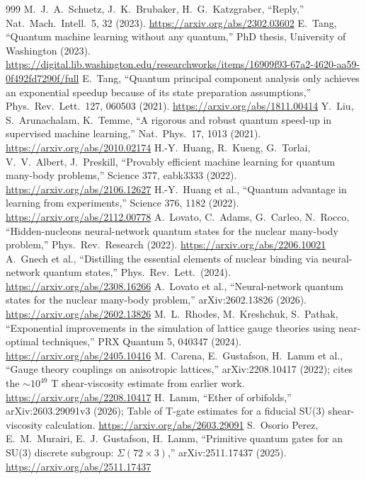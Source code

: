\begin{thebibliography}{999}
 M.~J.~A.~Schuetz, J.~K.~Brubaker, H.~G.~Katzgraber, ``Reply,'' Nat.\ Mach.\ Intell.\ 5, 32 (2023). \url{https://arxiv.org/abs/2302.03602}
 E.~Tang, ``Quantum machine learning without any quantum,'' PhD thesis, University of Washington (2023). \url{https://digital.lib.washington.edu/researchworks/items/16909f93-67a2-4620-aa59-0f492fd7290f/full}
 E.~Tang, ``Quantum principal component analysis only achieves an exponential speedup because of its state preparation assumptions,'' Phys.\ Rev.\ Lett.\ 127, 060503 (2021). \url{https://arxiv.org/abs/1811.00414}
 Y.~Liu, S.~Arunachalam, K.~Temme, ``A rigorous and robust quantum speed-up in supervised machine learning,'' Nat.\ Phys.\ 17, 1013 (2021). \url{https://arxiv.org/abs/2010.02174}
 H.-Y.~Huang, R.~Kueng, G.~Torlai, V.~V.~Albert, J.~Preskill, ``Provably efficient machine learning for quantum many-body problems,'' Science 377, eabk3333 (2022). \url{https://arxiv.org/abs/2106.12627}
 H.-Y.~Huang et al., ``Quantum advantage in learning from experiments,'' Science 376, 1182 (2022). \url{https://arxiv.org/abs/2112.00778}
 A.~Lovato, C.~Adams, G.~Carleo, N.~Rocco, ``Hidden-nucleons neural-network quantum states for the nuclear many-body problem,'' Phys.\ Rev.\ Research (2022). \url{https://arxiv.org/abs/2206.10021}
 A.~Gnech et al., ``Distilling the essential elements of nuclear binding via neural-network quantum states,'' Phys.\ Rev.\ Lett.\ (2024). \url{https://arxiv.org/abs/2308.16266}
 A.~Lovato et al., ``Neural-network quantum states for the nuclear many-body problem,'' arXiv:2602.13826 (2026). \url{https://arxiv.org/abs/2602.13826}
 M.~L.~Rhodes, M.~Kreshchuk, S.~Pathak, ``Exponential improvements in the simulation of lattice gauge theories using near-optimal techniques,'' PRX Quantum 5, 040347 (2024). \url{https://arxiv.org/abs/2405.10416}
 M.~Carena, E.~Gustafson, H.~Lamm et al., ``Gauge theory couplings on anisotropic lattices,'' arXiv:2208.10417 (2022); cites the $\sim10^{49}$ T shear-viscosity estimate from earlier work. \url{https://arxiv.org/abs/2208.10417}
 H.~Lamm, ``Ether of orbifolds,'' arXiv:2603.29091v3 (2026); Table of T-gate estimates for a fiducial SU(3) shear-viscosity calculation. \url{https://arxiv.org/abs/2603.29091}
 S.~Osorio Perez, E.~M.~Murairi, E.~J.~Gustafson, H.~Lamm, ``Primitive quantum gates for an SU(3) discrete subgroup: $\Sigma(72\times3)$,'' arXiv:2511.17437 (2025). \url{https://arxiv.org/abs/2511.17437}

\end{thebibliography}
